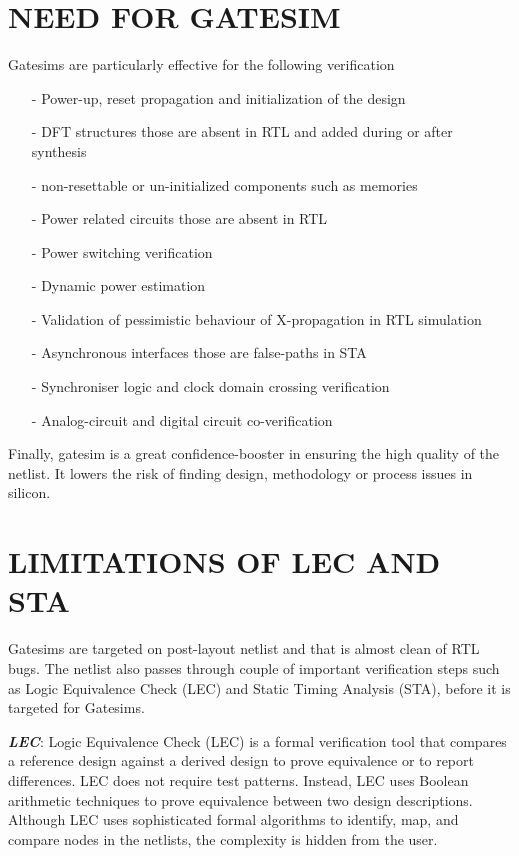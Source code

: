 \section {NEED FOR GATESIM}
Gatesims are particularly effective for the following verification
\begin{itemize}
	\item[-]Power-up, reset propagation and initialization of the design
	\item[-]DFT structures those are absent in RTL and added during or after synthesis
	\item[-]non-resettable or un-initialized components such as memories
	\item[-]Power related circuits those are absent in RTL
	\item[-]Power switching verification
	\item[-]Dynamic power estimation
	\item[-]Validation of pessimistic behaviour of X-propagation in RTL simulation
	\item[-]Asynchronous interfaces those are false-paths in STA
	\item[-]Synchroniser logic and clock domain crossing verification
	\item[-]Analog-circuit and digital circuit co-verification
\end{itemize}

Finally, gatesim is a great confidence-booster in ensuring the high quality of the netlist. It lowers the risk of finding design, methodology or process issues in silicon.




\section{LIMITATIONS OF LEC AND STA}

Gatesims are targeted on post-layout netlist and that is almost clean of RTL bugs. The netlist also passes through couple of important verification steps such as Logic Equivalence Check (LEC) and Static Timing Analysis (STA), before it is targeted for Gatesims.

\emph {\bf LEC}: Logic Equivalence Check (LEC) is a formal verification tool that compares a reference design against a derived design to prove equivalence or to report differences.  LEC does not require test patterns. Instead, LEC uses Boolean arithmetic techniques to prove equivalence between two design descriptions\cite{ieee:boolean}. Although LEC uses sophisticated formal algorithms to identify, map, and compare nodes in the netlists, the complexity is hidden from the user\cite{lec}.

